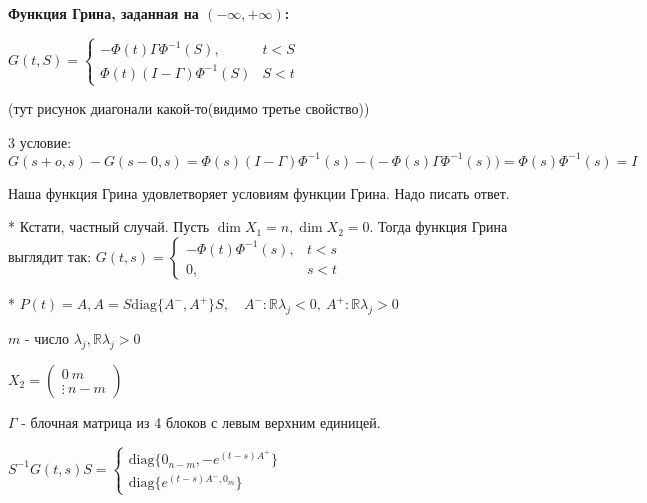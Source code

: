 \documentclass[12pt, a4paper]{article}
\begin{document}
    \par $ $

    \textbf{\large Функция Грина, заданная на $(-\infty, +\infty)$:}
    
    $G(t,S) = \begin{cases}
        -\Phi(t)\Gamma\Phi^{-1}(S), & t < S \\
        \Phi(t)(I-\Gamma)\Phi^{-1}(S) & S < t
    \end{cases}$  

    {\tiny(тут рисунок диагонали какой-то(видимо третье свойство))}

    3 условие: $G(s + o, s) - G(s-0, s) = \Phi(s)(I-\Gamma)\Phi^{-1}(s) - \big( -\Phi(s)\Gamma\Phi^{-1}(s) \big) = \Phi(s)\Phi^{-1}(s) = I$

    Наша функция Грина удовлетворяет условиям функции Грина. Надо писать ответ.
    
    * Кстати, частный случай. Пусть $\dim X_1 = n, \dim X_2 = 0$. Тогда функция Грина выглядит так:
    $G(t, s) = \begin{cases}
        -\Phi(t)\Phi^{-1}(s), & t < s \\
        0, & s < t
    \end{cases}$

    * $P(t) = A, A = S \text{diag}\{A^-, A^+\}S, \quad A^-: \mathbb{R}\lambda_j < 0, \ A^+: \mathbb{R}\lambda_j > 0$

    $m$ - число $\lambda_j, \mathbb{R}\lambda_j > 0$

    $X_2 = \begin{pmatrix}
        0 \ m \\ \vdots\ n-m
    \end{pmatrix}$


    $\Gamma$ - блочная матрица из 4 блоков с левым верхним единицей. 

    $S^{-1}G(t, s)S =\begin{cases}
        \text{diag}\{ 0_{n-m}, -e^{(t-s)A^+} \} \\ 
        \text{diag}\{e^{(t-s)A^-, 0_m}\}
    \end{cases} $
    
\end{document}
